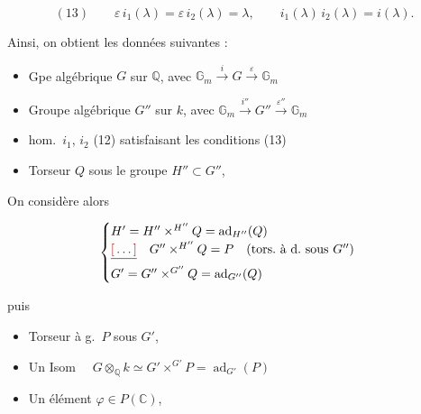 \documentclass[11pt,a4paper]{article}
\begin{document}
\ill{} \struck{\ill{}}

\[ (13) \qquad \varepsilon\, i_{1}(\lambda) = \varepsilon\, i_{2}(\lambda) = \lambda , \qquad i_{1}(\lambda)\, i_{2}(\lambda) = i(\lambda) . \]

Ainsi, on obtient les données suivantes :

\begin{itemize}
  \item[a)] Gpe algébrique $G$ sur $\mathbb{Q}$, avec
  $\mathbb{G}_{m} \xrightarrow{\ i\ } G \xrightarrow{\ \varepsilon\ } \mathbb{G}_{m}$ \ill{}
  \item[b)] Groupe algébrique $G''$ sur $k$, avec
  $\mathbb{G}_{m} \xrightarrow{\ i''\ } G'' \xrightarrow{\ \varepsilon''\ } \mathbb{G}_{m}$ \ill{}
  \item[c)] hom.\ $i_{1}$, $i_{2}$ (12) satisfaisant les conditions (13)
  \item[d)] Torseur  $Q$ sous le groupe  $H'' \subset G''$, \ill{}
\end{itemize}

On considère alors

\[ \begin{cases} H' = H'' \times^{H''} Q = \operatorname{ad}_{H''}(Q) \\
\struck{\ill{}} \quad G'' \times^{H''} Q = P \quad (\text{tors.\ à d.\ sous } G'') \\
G' = G'' \times^{G''} Q = \operatorname{ad}_{G''}(Q) \end{cases} \]


puis

\begin{itemize}
  \item[e)] Torseur à g.\ $P$ sous $G'$, \struck{\ill{}}
  \item[f)] Un \struck{\ill{}} Isom \ \ $G \otimes_{\mathbb{Q}} k \simeq G' \times^{G'} P = \operatorname{ad}_{G'}(P)$
  \item[g)] Un élément $\varphi \in P(\mathbb{C})$, \struck{\ill{}}
\end{itemize}



\struck{\ill{}}

\end{document}
